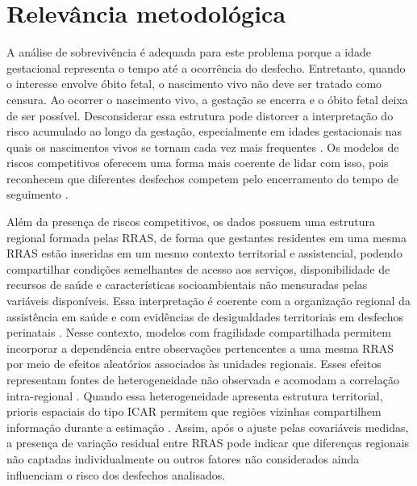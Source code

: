 \section{Relevância metodológica}

A análise de sobrevivência é adequada para este problema porque a idade gestacional 
representa o tempo até a ocorrência do desfecho. Entretanto, quando o interesse 
envolve óbito fetal, o nascimento vivo não deve ser tratado como censura. Ao ocorrer 
o nascimento vivo, a gestação se encerra e o óbito fetal deixa de ser possível. 
Desconsiderar essa estrutura pode distorcer a interpretação do risco acumulado ao 
longo da gestação, especialmente em idades gestacionais nas quais os nascimentos 
vivos se tornam cada vez mais frequentes \cite{naimi2016cumulative,smith2016competing}. 
Os modelos de riscos competitivos oferecem uma forma mais coerente de lidar com isso, 
pois reconhecem que diferentes desfechos competem pelo encerramento do tempo de 
seguimento \cite{satagopan2004note,finegray1999,naimi2016cumulative,Austin2016CompetingRisks}. 

Além da presença de riscos competitivos, os dados possuem uma estrutura regional 
formada pelas RRAS, de forma que gestantes residentes em uma mesma RRAS estão 
inseridas em um mesmo contexto territorial e assistencial, podendo compartilhar 
condições semelhantes de acesso aos serviços, disponibilidade de recursos de saúde 
e características socioambientais não mensuradas pelas variáveis disponíveis. Essa 
interpretação é coerente com a organização regional da assistência em saúde e com 
evidências de desigualdades territoriais em desfechos perinatais 
\cite{rocha2025space,SESSPRegionalizacao2026,Marques2021FetalSocialVulnerabilitySP}. 
Nesse contexto, modelos com fragilidade compartilhada permitem incorporar a 
dependência entre observações pertencentes a uma mesma RRAS por meio de efeitos 
aleatórios associados às unidades regionais. Esses efeitos representam fontes de 
heterogeneidade não observada e acomodam a correlação intra-regional 
\cite{clayton1978model,vaupel1979impact,balan2020tutorial}. Quando essa 
heterogeneidade apresenta estrutura territorial, prioris espaciais do tipo ICAR 
permitem que regiões vizinhas compartilhem informação durante a estimação 
\cite{besag1991,rueheld2005}. Assim, após o ajuste pelas covariáveis medidas, a 
presença de variação residual entre RRAS pode indicar que diferenças regionais 
não captadas individualmente ou outros fatores não considerados ainda influenciam 
o risco dos desfechos analisados.

